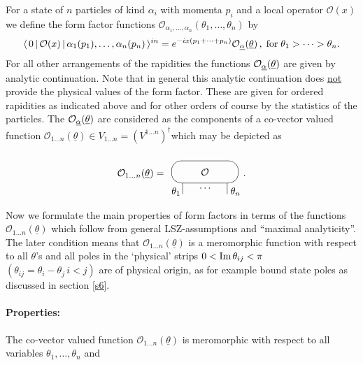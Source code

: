 \documentclass[a4paper,a4paper]{article}
\begin{document}
For a state of $n$ particles of kind $\alpha _{i}$ with momenta $p_{i}$ and
a local operator $\mathcal{O}(x)$ we define the form factor functions $%
\mathcal{O}_{\alpha _{1},\dots ,\alpha _{n}}(\theta _{1},\dots ,\theta _{n})$
by 
\begin{equation}
\langle \,0\,|\,\mathcal{O}(x)\,|\,\alpha _{1}(p_{1}),\dots ,\alpha
_{n}(p_{n})\,\rangle ^{in}=e^{-ix(p_{1}+\cdots +p_{n})}\mathcal{O}_{%
\underline{\alpha }}(\underline{\theta })\,,\;\mathrm{for}\;\theta
_{1}>\dots >\theta _{n}.  \label{f}
\end{equation}
For all other arrangements of the rapidities the functions $\mathcal{O}_{%
\underline{\alpha }}({\underline{\theta }})$ are given by analytic
continuation. Note that in general this analytic continuation does 
\underline{not} provide the physical values of the form factor. These are
given for ordered rapidities as indicated above and for other orders of
course by the statistics of the particles. The $\mathcal{O}_{\underline{%
\alpha }}({\underline{\theta }})$ are considered as the components of a
co-vector valued function $\mathcal{O}_{1\dots n}({\underline{\theta }})\in
V_{1\dots n}=\left( V^{1\dots n}\right) ^{\dagger }$which may be depicted as 
\[
\mathcal{O}_{1\dots n}({\underline{\theta }})= 
\begin{array}{c}
\unitlength4mm\begin{picture}(6,4) \put(3,2){\oval(6,2)}
\put(3,2){\makebox(0,0){${\cal O}$}} \put(1,0){\line(0,1){1}}
\put(5,0){\line(0,1){1}} \put(0,0){$\theta_1$} \put(5.3,0){$\theta_n$}
\put(2.5,.5){$\dots$} \end{picture}
\end{array}
. 
\]

Now we formulate the main properties of form factors in terms of the
functions $\mathcal{O}_{1\dots n}({\underline{\theta }})$ which follow from
general LSZ-assumptions and ``maximal analyticity''. The later condition
means that $\mathcal{O}_{1\dots n}({\underline{\theta }})$ is a meromorphic
function with respect to all $\theta $'s and all poles in the `physical'
strips $0<\mathop{\rm Im}\theta _{ij}<\pi $~$(\theta _{ij}=\theta
_{i}-\theta _{j}\,i<j)$ are of physical origin, as for example bound state
poles as discussed in section \ref{s6}.

\paragraph{\textbf{Properties:\label{pf}}}

The co-vector valued function $\mathcal{O}_{1\dots n}({\underline{\theta }})$
is meromorphic with respect to all variables $\theta _{1},\dots ,\theta _{n}$
and
\end{document}
